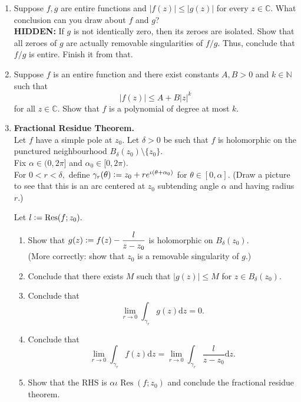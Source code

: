 \documentclass[12pt]{article}
\theoremstyle{definition}
\numberwithin{thm}{section}
\newcommand{\Res}{\operatorname{Res}}
\newcommand{\hint}[1]{\textbf{HIDDEN:} {\color[rgb]{0.95, 0.95, 0.95}#1}}
\begin{document}
\begin{enumerate}
\begin{enumerate}
		\item Show that $\varphi_\alpha$ is nonconstant. Conclude that if $z \in U,$ then $\varphi_\alpha(z) \in U.$\\
		\hint{Use MMT.}
		\item The above shows that $\varphi_\alpha(U) \subset U.$ By considering $\varphi_{-\alpha},$ show that the equality $\varphi_\alpha(U) = U$ is true. Conclude that $\varphi_\alpha|_U$ is a bijection from $U$ onto itself.
	\end{enumerate}
	\item Suppose $f, g$ are entire functions and $|f(z)| \le |g(z)|$ for every $z \in \mathbb{C}.$ What conclusion can you draw about $f$ and $g$? \\
	\hint{If $g$ is not identically zero, then its zeroes are isolated. Show that all zeroes of $g$ are actually removable singularities of $f/g.$ Thus, conclude that $f/g$ is entire. Finish it from that. }
	\item Suppose $f$ is an entire function and there exist constants $A, B > 0$ and $k \in \mathbb{N}$ such that 
	\begin{equation*} 
		|f(z)| \le A + B|z|^k
	\end{equation*}
	for all $z \in \mathbb{C}.$ Show that $f$ is a polynomial of degree at most $k.$
	\item \textbf{Fractional Residue Theorem.} \\
	Let $f$ have a simple pole at $z_0.$ Let $\delta > 0$ be such that $f$ is holomorphic on the punctured neighbourhood $B_\delta(z_0)\setminus\{z_0\}.$\\
	Fix $\alpha \in (0, 2\pi]$ and $\alpha_0 \in [0, 2\pi).$ \\
	For $0 < r < \delta,$ define $\gamma_r(\theta) \vcentcolon= z_0 + re^{\iota(\theta + \alpha_0)}$ for $\theta \in [0, \alpha].$ (Draw a picture to see that this is an arc centered at $z_0$ subtending angle $\alpha$ and having radius $r.$)

	Let $l \vcentcolon= \Res(f; z_0).$ \begin{enumerate}
		\item Show that $g(z) \vcentcolon= f(z) - \dfrac{l}{z - z_0}$ is holomorphic on $B_\delta(z_0).$\\
		(More correctly: show that $z_0$ is a removable singularity of $g.$)
		\item Conclude that there exists $M$ such that $|g(z)| \le M$ for $z \in B_\delta(z_0).$
		\item Conclude that
		\begin{equation*} 
			\lim_{r\to 0}\int_{\gamma_r}^{} g(z) {\mathrm{d}}z = 0.
		\end{equation*}
		\item Conclude that
		\begin{equation*} 
			\lim_{r\to 0}\int_{\gamma_r}^{} f(z) {\mathrm{d}}z = \lim_{r\to 0}\int_{\gamma_r}^{} \dfrac{l}{z - z_0} {\mathrm{d}}z.
		\end{equation*}
		\item Show that the RHS is $\alpha\iota\Res(f; z_0)$ and conclude the fractional residue theorem.
	\end{enumerate} 


\end{enumerate}
\end{document}
